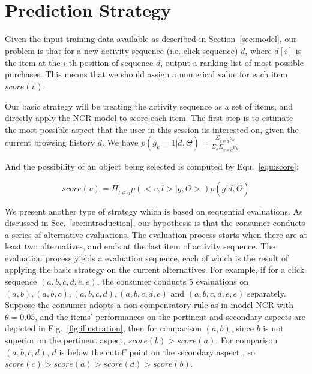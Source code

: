 \documentclass[sigconf]{acmart}
\begin{document}
\section{Prediction Strategy}\label{sec:strategy}

Given the input training data available as described in Section~\ref{sec:model}, our problem is that for a new activity sequence (i.e. click sequence) $\tilde{d}$,  where $\tilde{d}[i]$ is the item at the $i$-th position of sequence $\tilde{d}$,  output a ranking list of most possible purchases. This means that we should assign a numerical value for each item $score(v)$. 
 
Our basic strategy will be treating the activity sequence as a set of items, and directly apply the NCR model to score each item.  The first step is to estimate the most possible aspect that the user in this session iis interested on, given the current browsing history $\tilde{d}$. We have $p(g_k=1|\tilde{d},\Theta)=\frac{\Sigma_{v\in \tilde{d}} v_k}{\Sigma_k \Sigma_{v\in \tilde{d}} v_k}$

And the possibility of an object being selected is computed by Equ.~\ref{equ:score}: 

\begin{equation}\label{equ:score}
score(v)=\Pi_{l \in \tilde{d}} p(<v, l>|g,\Theta>)p(g|\tilde{d},\Theta)
\end{equation}

We present another type of strategy which is based on sequential evaluations. As discussed in Sec.~\ref{sec:introduction}, our hypothesis is that the consumer conducts a series of alternative evaluations. The evaluation process starts when there are at least two alternatives, and ends at the last item of activity sequence. The evaluation process yields a evaluation sequence, each of which is the result of applying the basic strategy on the current alternatives. For example, if for a click sequence $(a,b,c,d,e,e)$, the consumer conducts 5 evaluations on $(a,b), (a,b,c), (a,b,c,d),(a,b,c,d,e)$ and $(a,b,c,d,e,e) $ separately. Suppose the consumer adopts a non-compensatory rule as in model NCR with $\theta=0.05$, and the items' performances on the pertinent and secondary aspects are depicted in Fig.~\ref{fig:illustration}, then for comparison $(a,b)$, since $b$ is not superior on the pertinent aspect, $score(b)>score(a)$. For comparison $(a,b,c,d)$,  $d$ is below the cutoff point on the secondary aspect , so $score(c)>score(a)>score(d)>score(b)$. 
\end{document}
